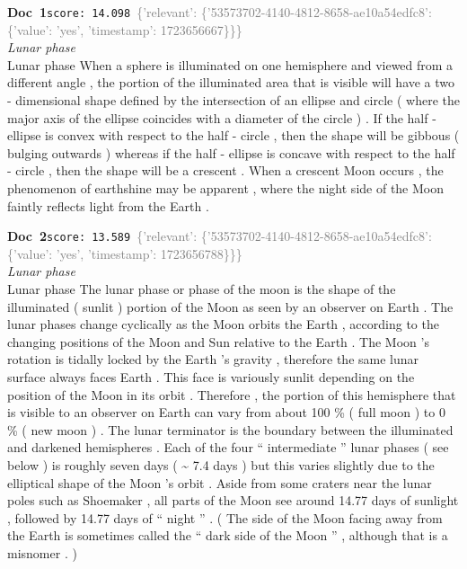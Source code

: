 \documentclass[a4paper,11pt]{article}
\begin{document}
\begin{docenv}
{\footnotesize\textcolor{doccolor}{\textbf{Doc~1}}}\hfill{\tiny\texttt{score:~14.098}}\ {\tiny\textcolor{gray}{\{'relevant': \{'53573702-4140-4812-8658-ae10a54edfc8': \{'value': 'yes', 'timestamp': 1723656667\}\}\}}}\\[3pt]
{\small\textit{Lunar phase}}\\[2pt]
\vspace{2pt}
{\footnotesize Lunar phase
When a sphere is illuminated on one hemisphere and viewed from a different angle , the portion of the illuminated area that is visible will have a two - dimensional shape defined by the intersection of an ellipse and circle ( where the major axis of the ellipse coincides with a diameter of the circle ) . If the half - ellipse is convex with respect to the half - circle , then the shape will be gibbous ( bulging outwards ) whereas if the half - ellipse is concave with respect to the half - circle , then the shape will be a crescent . When a crescent Moon occurs , the phenomenon of earthshine may be apparent , where the night side of the Moon faintly reflects light from the Earth .}
\end{docenv}
\begin{docenv}
{\footnotesize\textcolor{doccolor}{\textbf{Doc~2}}}\hfill{\tiny\texttt{score:~13.589}}\ {\tiny\textcolor{gray}{\{'relevant': \{'53573702-4140-4812-8658-ae10a54edfc8': \{'value': 'yes', 'timestamp': 1723656788\}\}\}}}\\[3pt]
{\small\textit{Lunar phase}}\\[2pt]
\vspace{2pt}
{\footnotesize Lunar phase
The lunar phase or phase of the moon is the shape of the illuminated ( sunlit ) portion of the Moon as seen by an observer on Earth . The lunar phases change cyclically as the Moon orbits the Earth , according to the changing positions of the Moon and Sun relative to the Earth . The Moon 's rotation is tidally locked by the Earth 's gravity , therefore the same lunar surface always faces Earth . This face is variously sunlit depending on the position of the Moon in its orbit . Therefore , the portion of this hemisphere that is visible to an observer on Earth can vary from about 100 \% ( full moon ) to 0 \% ( new moon ) . The lunar terminator is the boundary between the illuminated and darkened hemispheres . Each of the four `` intermediate '' lunar phases ( see below ) is roughly seven days ( \textasciitilde{} 7.4 days ) but this varies slightly due to the elliptical shape of the Moon 's orbit . Aside from some craters near the lunar poles such as Shoemaker , all parts of the Moon see around 14.77 days of sunlight , followed by 14.77 days of `` night '' . ( The side of the Moon facing away from the Earth is sometimes called the `` dark side of the Moon '' , although that is a misnomer . )}
\end{docenv}
\end{document}
